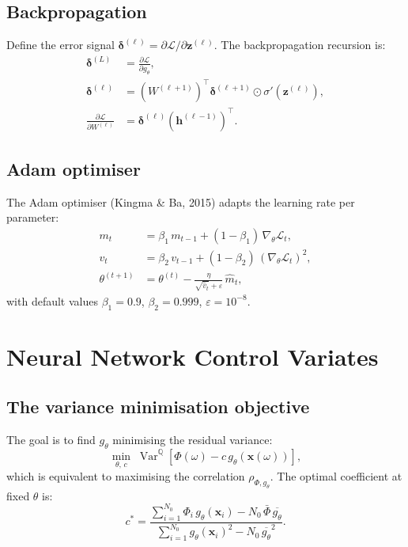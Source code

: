 \documentclass[12pt, a4paper]{report}
\theoremstyle{definition}
\newcommand{\Q}{\mathbb{Q}}
\newcommand{\Var}{\operatorname{Var}}
\begin{document}
\subsection{Backpropagation}

Define the error signal $\boldsymbol{\delta}^{(\ell)} =
\partial \mathcal{L} / \partial \mathbf{z}^{(\ell)}$.  The
backpropagation recursion is:
\begin{align}
    \boldsymbol{\delta}^{(L)} &= \frac{\partial \mathcal{L}}
    {\partial g_\theta}, \label{eq:bp-output}\\
    \boldsymbol{\delta}^{(\ell)} &= \left(W^{(\ell+1)}\right)^\top
    \boldsymbol{\delta}^{(\ell+1)} \odot \sigma'(\mathbf{z}^{(\ell)}),
    \label{eq:bp-hidden}\\
    \frac{\partial \mathcal{L}}{\partial W^{(\ell)}} &=
    \boldsymbol{\delta}^{(\ell)} \left(\mathbf{h}^{(\ell-1)}\right)^\top.
    \label{eq:bp-grad}
\end{align}

\subsection{Adam optimiser}

The Adam optimiser (Kingma \& Ba, 2015) adapts the learning rate per
parameter:
\begin{align}
    m_t &= \beta_1\,m_{t-1} + (1 - \beta_1)\,\nabla_\theta\mathcal{L}_t,
    \label{eq:adam-m}\\
    v_t &= \beta_2\,v_{t-1} + (1 - \beta_2)\,
    (\nabla_\theta\mathcal{L}_t)^2,
    \label{eq:adam-v}\\
    \theta^{(t+1)} &= \theta^{(t)} - \frac{\eta}{\sqrt{\hat{v}_t}
    + \varepsilon}\,\hat{m}_t,
    \label{eq:adam-update}
\end{align}
with default values $\beta_1 = 0.9$, $\beta_2 = 0.999$,
$\varepsilon = 10^{-8}$.

\section{Neural Network Control Variates}
\label{sec:nn-cv}

\subsection{The variance minimisation objective}

The goal is to find $g_\theta$ minimising the residual variance:
\begin{equation}
    \min_{\theta,\, c}\;\Var^{\Q}\!\left[\Phi(\omega)
    - c\,g_\theta(\mathbf{x}(\omega))\right],
    \label{eq:nn-cv-objective}
\end{equation}
which is equivalent to maximising the correlation
$\rho_{\Phi, g_\theta}$.  The optimal coefficient at fixed $\theta$ is:
\begin{equation}
    c^* = \frac{\sum_{i=1}^{N_0} \Phi_i\,g_\theta(\mathbf{x}_i)
    - N_0\,\bar{\Phi}\,\overline{g_\theta}}
    {\sum_{i=1}^{N_0} g_\theta(\mathbf{x}_i)^2
    - N_0\,\overline{g_\theta}^2}.
    \label{eq:nn-c-star}
\end{equation}
\end{document}
